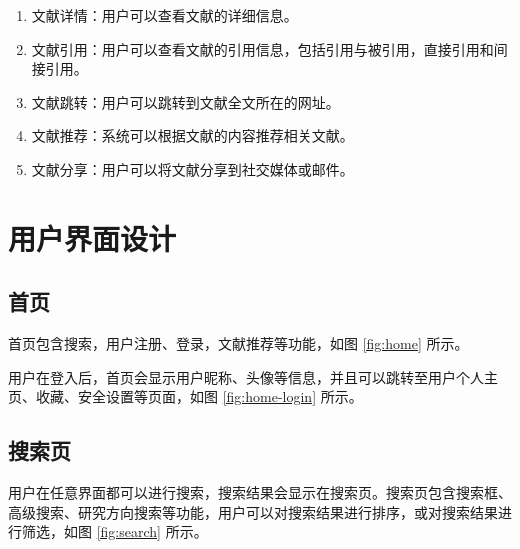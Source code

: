\documentclass[UTF8,openany]{ctexbook}
\begin{document}
\begin{enumerate}
    \item 文献详情：用户可以查看文献的详细信息。
    \item 文献引用：用户可以查看文献的引用信息，包括引用与被引用，直接引用和间接引用。
    \item 文献跳转：用户可以跳转到文献全文所在的网址。
    \item 文献推荐：系统可以根据文献的内容推荐相关文献。
    \item 文献分享：用户可以将文献分享到社交媒体或邮件。
\end{enumerate}

\chapter{用户界面设计}

\section{首页}

首页包含搜索，用户注册、登录，文献推荐等功能，如图 \ref{fig:home} 所示。


用户在登入后，首页会显示用户昵称、头像等信息，并且可以跳转至用户个人主页、收藏、安全设置等页面，如图 \ref{fig:home-login} 所示。


\section{搜索页}

用户在任意界面都可以进行搜索，搜索结果会显示在搜索页。搜索页包含搜索框、高级搜索、研究方向搜索等功能，用户可以对搜索结果进行排序，或对搜索结果进行筛选，如图 \ref{fig:search} 所示。

\end{document}
